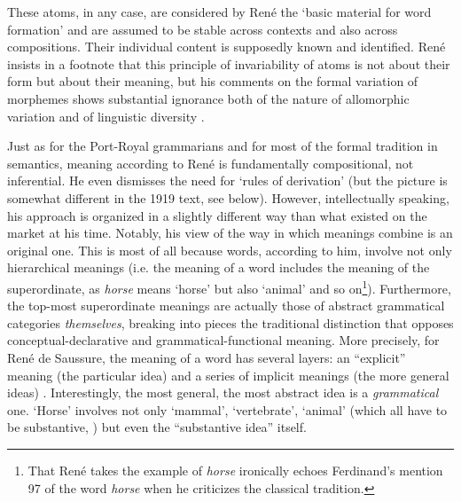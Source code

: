 \documentclass[output=paper]{langsci/langscibook}
\begin{document}
These atoms, in any case, are considered by René the ‘basic material
for word formation’ \citep[5]{r.desaussure11:formation} and are
assumed to be stable across contexts and also across
compositions. Their individual content is supposedly known and
identified. René insists in a footnote that this principle of
invariability of atoms is not about their form but about their
meaning, but his comments on the formal variation of morphemes shows
substantial ignorance both of the nature of allomorphic variation and
of linguistic diversity \citep[6]{r.desaussure11:formation}.

Just as for the Port-Royal grammarians and for most of the formal
tradition in semantics, meaning according to René is fundamentally
compositional, not inferential. He even dismisses the need for ‘rules
of derivation’ \citep[8]{r.desaussure11:formation} (but the picture
is somewhat different in the 1919 text, see below). However,
intellectually speaking, his approach is organized in a slightly
different way than what existed on the market at his time. Notably,
his view of the way in which meanings combine is an original one. This
is most of all because words, according to him, involve not only
hierarchical meanings (i.e. the meaning of a word includes the meaning
of the superordinate, as \emph{horse} means ‘horse’ but also ‘animal’
and so on\footnote{That René takes the example of \emph{horse}
  ironically echoes Ferdinand's mention \citep[97]{saussure:cours}{97}
  of the word \emph{horse} when he criticizes the classical
  tradition.}). Furthermore, the top-most superordinate meanings are
actually those of abstract grammatical categories \emph{themselves},
breaking into pieces the traditional distinction that opposes
conceptual-declarative and grammatical-functional meaning. More
precisely, for René de Saussure, the meaning of a word has several
layers: an ``explicit'' meaning (the particular idea) and a series of
implicit meanings (the more general ideas)
\citep[10]{r.desaussure11:formation}. Interestingly, the most
general, the most abstract idea is a \emph{grammatical} one. ‘Horse’
involves not only ‘mammal’, ‘vertebrate’, ‘animal’ (which all have to
be substantive, \citealt[13]{r.desaussure11:formation}) but even the
``substantive idea'' itself.
\end{document}
